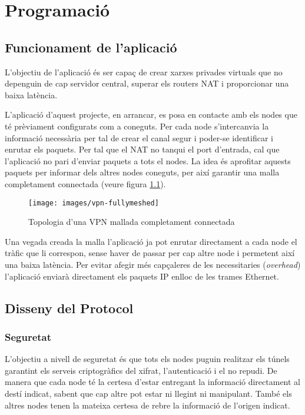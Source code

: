 \chapter{Programació}
\section{Funcionament de l'aplicació}
L'objectiu de l'aplicació és ser capaç de crear xarxes privades virtuals que no depenguin de cap servidor central, superar els routers NAT i proporcionar una baixa latència.

L'aplicació d'aquest projecte, en arrancar, es posa en contacte amb els nodes que té prèviament configurats com a coneguts. Per cada node s'intercanvia la informació necessària per tal de crear el canal segur i poder-se identificar i enrutar els paquets. Per tal que el NAT no tanqui el port d'entrada, cal que l'aplicació no pari d'enviar paquets a tots el nodes. La idea és aprofitar aquests paquets per informar dels altres nodes coneguts, per així garantir una malla completament connectada (veure figura \ref{F:vpn-fullymeshed}).
\begin{figure}[htb]
\centering
\texttt{[image: images/vpn-fullymeshed]}
\caption{Topologia d'una VPN mallada completament connectada}
\label{F:vpn-fullymeshed}
\end{figure}
Una vegada creada la malla l'aplicació ja pot enrutar directament a cada node el tràfic que li correspon, sense haver de passar per cap altre node i permetent així una baixa latència. Per evitar afegir més capçaleres de les necessitaries (\emph{overhead}) l'aplicació enviarà directament els paquets IP enlloc de les trames Ethernet.

\section{Disseny del Protocol}
\subsection{Seguretat}
L'objectiu a nivell de seguretat és que tots els nodes puguin realitzar els túnels garantint els serveis criptogràfics del xifrat, l'autenticació i el no repudi. De manera que cada node té la certesa d'estar entregant la informació directament al destí indicat, sabent que cap altre pot estar ni llegint ni manipulant. També els altres nodes tenen la mateixa certesa de rebre la informació de l'origen indicat.

